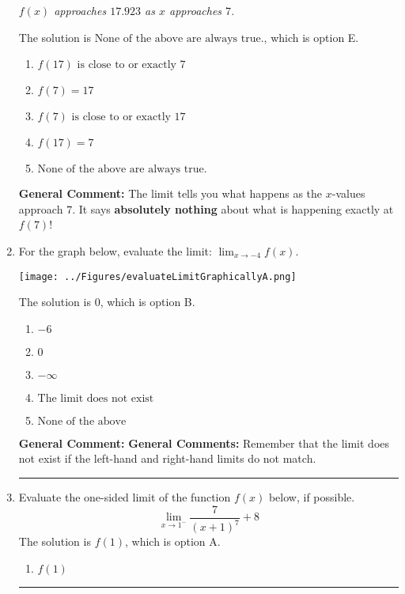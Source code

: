 \documentclass{extbook}[14pt]
\newcommand{\litem}[1]{\item #1

\rule{\textwidth}{0.4pt}}
\begin{document}
\begin{enumerate}
{\begin{center}
    \textit{ $f(x)$ approaches $17.923$ as $x$ approaches $7$. }
\end{center}
The solution is \( \text{None of the above are always true.} \), which is option E.\begin{enumerate}[label=\Alph*.]
\item \( f(17) \text{ is close to or exactly } 7 \)


\item \( f(7) = 17 \)


\item \( f(7) \text{ is close to or exactly } 17 \)


\item \( f(17) = 7 \)


\item \( \text{None of the above are always true.} \)


\end{enumerate}

\textbf{General Comment:} The limit tells you what happens as the $x$-values approach $7$. It says \textbf{absolutely nothing} about what is happening exactly at $f(7)$!
}
\litem{
For the graph below, evaluate the limit: $ \displaystyle \lim_{x \rightarrow -4} f(x)$.

\begin{center}
    \texttt{[image: ../Figures/evaluateLimitGraphicallyA.png]}
\end{center}


The solution is \( 0 \), which is option B.\begin{enumerate}[label=\Alph*.]
\item \( -6 \)


\item \( 0 \)


\item \( -\infty \)


\item \( \text{The limit does not exist} \)


\item \( \text{None of the above} \)


\end{enumerate}

\textbf{General Comment:} \textbf{General Comments:} Remember that the limit does not exist if the left-hand and right-hand limits do not match.
}
\litem{
Evaluate the one-sided limit of the function $f(x)$ below, if possible.
\[ \lim_{x \rightarrow 1^-} \frac{7}{(x+1)^7}+8 \]The solution is \( f(1) \), which is option A.\begin{enumerate}[label=\Alph*.]
\item \( f(1) \)



\end{enumerate}}
\end{enumerate}
\end{document}
